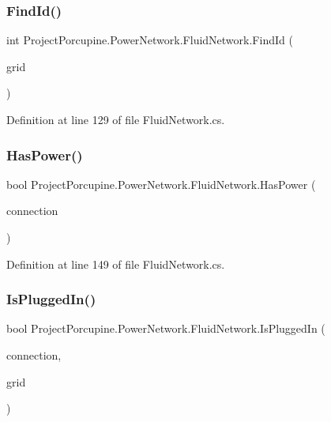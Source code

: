 \subsubsection{\texorpdfstring{Find\+Id()}{FindId()}}
{\footnotesize\ttfamily int Project\+Porcupine.\+Power\+Network.\+Fluid\+Network.\+Find\+Id (\begin{DoxyParamCaption}\item[{\hyperlink{class_project_porcupine_1_1_power_network_1_1_grid}{Grid}}]{grid }\end{DoxyParamCaption})}



Definition at line 129 of file Fluid\+Network.\+cs.

\mbox{\label{class_project_porcupine_1_1_power_network_1_1_fluid_network_a32ce0d32ac824202fd9ac3bb50f37253}} 
\subsubsection{\texorpdfstring{Has\+Power()}{HasPower()}}
{\footnotesize\ttfamily bool Project\+Porcupine.\+Power\+Network.\+Fluid\+Network.\+Has\+Power (\begin{DoxyParamCaption}\item[{\hyperlink{interface_project_porcupine_1_1_power_network_1_1_i_pluggable}{I\+Pluggable}}]{connection }\end{DoxyParamCaption})}



Definition at line 149 of file Fluid\+Network.\+cs.

\mbox{\label{class_project_porcupine_1_1_power_network_1_1_fluid_network_a1fe6971c5ba7c3c6a9a9cbc16cfa04b3}} 
\subsubsection{\texorpdfstring{Is\+Plugged\+In()}{IsPluggedIn()}}
{\footnotesize\ttfamily bool Project\+Porcupine.\+Power\+Network.\+Fluid\+Network.\+Is\+Plugged\+In (\begin{DoxyParamCaption}\item[{\hyperlink{interface_project_porcupine_1_1_power_network_1_1_i_pluggable}{I\+Pluggable}}]{connection,  }\item[{out \hyperlink{class_project_porcupine_1_1_power_network_1_1_grid}{Grid}}]{grid }\end{DoxyParamCaption})}



